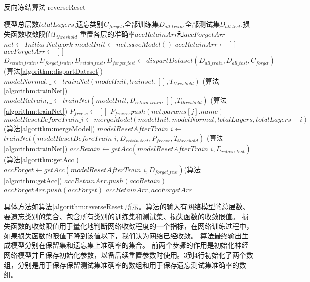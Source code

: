 \begin{algorithm}
	\renewcommand{\algorithmicrequire}{\textbf{Input:}}
	\renewcommand{\algorithmicensure}{\textbf{Output:}}
	\caption{反向冻结算法 reverseReset}
	\label{algorithm:reverseReset}
	\begin{algorithmic}[1]
        \REQUIRE 模型总层数$totalLayers$,遗忘类别$C_{forget}$,全部训练集$D_{all\_train}$,全部测试集$D_{all\_test}$,损失函数收敛限值$T_{threshold}$
        \ENSURE  重置各层的准确率$accRetainArr$和$accForgetArr$
        \STATE $net \gets Initial\ Network$
        \STATE $modelInit \gets net.saveModel()$
        \STATE $accRetainArr \gets []$
        \STATE $accForgetArr \gets []$
        \STATE $D_{retain\_train}, D_{forget\_train}, D_{retain\_test}, D_{forget\_test} \gets dispartDataset(D_{all\_train}, D_{all\_test}, C_{forget})$ (算法\ref{algorithm:dispartDataset})
        \STATE $modelNormal,\_ \gets trainNet(modelInit, trainset, [], T_{threshold})$ (算法\ref{algorithm:trainNet})
        \STATE $modelRetrain,\_ \gets trainNet(modelInit, D_{retain\_train}, [], T_{threshold})$ (算法\ref{algorithm:trainNet})
            \STATE $P_{freeze} \gets []$
                    \STATE $P_{freeze}.push(net.params[j].name)$
                \ENDIF
            \ENDFOR
            \STATE $modelResetBeforeTrain\_i \gets mergeModel(modelInit, modelNormal, totalLayers, totalLayers - i)$  (算法\ref{algorithm:mergeModel})
            \STATE $modelResetAfterTrain\_i \gets$ $trainNet(modelResetBeforeTrain\_i , D_{retain\_test}, P_{freeze}, T_{threshold})$  (算法\ref{algorithm:trainNet})
            \STATE $accRetain \gets getAcc(modelResetAfterTrain\_i, D_{retain\_test})$ (算法\ref{algorithm:getAcc})
            \STATE $accForget \gets getAcc(modelResetAfterTrain\_i, D_{forget\_test})$(算法\ref{algorithm:getAcc})
            \STATE $accRetainArr.push(accRetain)$
            \STATE $accForgetArr.push(accForget)$
        \ENDFOR
        \RETURN $accRetainArr, accForgetArr$
	\end{algorithmic}  
\end{algorithm}
具体方法如算法\ref{algorithm:reverseReset}所示。算法的输入有网络模型的总层数、要遗忘类别的集合、包含所有类别的训练集和测试集、损失函数的收敛限值。
损失函数的收敛限值用于量化地判断网络收敛程度的一个指标，在网络训练过程中，如果损失函数的限值下降到该值以下，我们认为网络已经收敛。
算法最终输出生成模型分别在保留集和遗忘集上准确率的集合。
前两个步骤的作用是初始化神经网络模型并且保存初始化参数，以备后续重置参数时使用。3到4行初始化了两个数组，分别是用于保存保留测试集准确率的数组和用于保存遗忘测试集准确率的数组。
